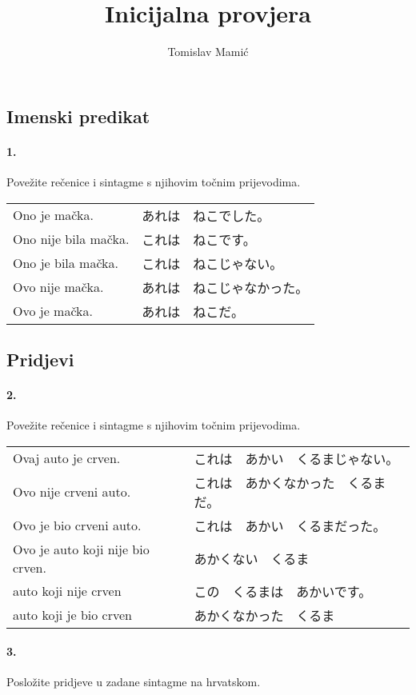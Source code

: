 \documentclass[12pt]{article}
\author{Tomislav Mamić}
\title{Inicijalna provjera}
\begin{document}
	\subsection{Imenski predikat}
	
	\paragraph{1.} Povežite rečenice i sintagme s njihovim točnim prijevodima.
	
	\begin{tabularx}{\textwidth}{X X}
		Ono je mačka.&あれは　ねこでした。\\
		Ono nije bila mačka.&これは　ねこです。\\
		Ono je bila mačka.&これは　ねこじゃない。\\
		Ovo nije mačka.&あれは　ねこじゃなかった。\\
		Ovo je mačka.&あれは　ねこだ。\\
	\end{tabularx}

	\subsection{Pridjevi}

	\paragraph{2.} Povežite rečenice i sintagme s njihovim točnim prijevodima.
	
	\begin{tabularx}{\textwidth}{X X}
		Ovaj auto je crven.&これは　あかい　くるまじゃない。\\
		Ovo nije crveni auto.&これは　あかくなかった　くるまだ。\\
		Ovo je bio crveni auto.&これは　あかい　くるまだった。\\
		Ovo je auto koji nije bio crven.&あかくない　くるま\\
		auto koji nije crven&この　くるまは　あかいです。\\
		auto koji je bio crven&あかくなかった　くるま\\
	\end{tabularx}

	\paragraph{3.} Posložite pridjeve u zadane sintagme na hrvatskom.
	
\end{document}
